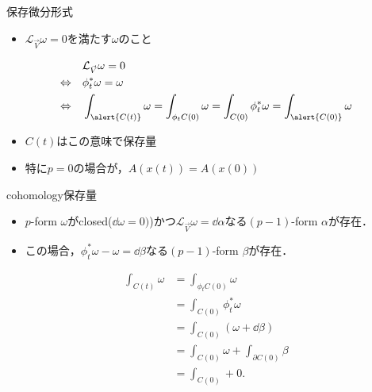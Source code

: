 \documentclass[dvipdfmx]{beamer}
\theoremstyle{break}
\renewcommand{\L}{\mathcal{L}}
\begin{document}
\begin{frame}{保存微分形式}
		\begin{itemize}
				\item $\L_{\vec{V}}\omega = 0 $を満たす$\omega  $のこと
		\end{itemize}
		\begin{align}
				 &\L_{\vec{V}}\omega = 0\\
				\Leftrightarrow\quad &\phi_t^{*} \omega = \omega \\
				\Leftrightarrow\quad & \int_{\alert{C(t)}}\omega  = \int_{\phi_tC(0)}\omega = \int_{C(0)}\phi_t^{*}\omega = \int_{\alert{C(0)}}\omega
		\end{align}
		\begin{itemize}
				\item $C(t) $はこの意味で保存量
				\item 特に$p=0 $の場合が，$A(x(t)) = A(x(0)) $
		\end{itemize}
\end{frame}

\begin{frame}{cohomology保存量}
		\begin{itemize}
				\item $p $-form $\omega $がclosed($\dd{\omega}=0)$)かつ$\L_{\vec{{V}}}\omega = \dd{\alpha} $なる$(p-1) $-form $\alpha $が存在．
				\item この場合，$\phi_t^{*}\omega - \omega = \dd{\beta} $なる$(p-1) $-form $\beta $が存在．
		\end{itemize}
		\begin{align}
				\int_{C(t)}\omega &= \int_{\phi_t C(0)}\omega \\
								  &= \int_{C(0)}\phi_t^{*}\omega\\
								  &= \int_{C(0)}(\omega + \dd{\beta})\\
								  &= \int_{C(0)}\omega + \int_{\partial C(0)}\beta\\
								  &= \int_{C(0)} +0.
		\end{align}
\end{frame}
\end{document}

